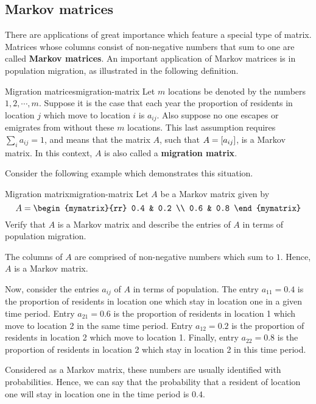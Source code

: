 \subsection{Markov matrices}

There are applications of great importance which feature a special type of matrix.  Matrices whose columns consist of non-negative numbers that sum to one are
called \textbf{Markov matrices}. An important application of Markov matrices is
in population migration, as illustrated in the following definition. 

\begin{definition}{Migration matrices}{migration-matrix}
Let $m$ locations be denoted by the numbers $1,2,\cdots ,m$. Suppose
it is the case that each year the proportion of residents in location
$j$ which move to location $i$ is $a_{ij}$. Also suppose no one
escapes or emigrates from without these $m$ locations. This last
assumption requires $\sum_{i}a_{ij}=1$, and means that the matrix $A$,
such that $A = \left[a_{ij} \right]$, is a Markov matrix. In this context,
$A$ is also called a \textbf{migration matrix}.
\end{definition}

Consider the following example which demonstrates this situation.

\begin{example}{Migration matrix}{migration-matrix}
Let $A$ be a Markov matrix given by 
\begin{equation*}
A = 
\begin{mymatrix}{rr}
0.4 & 0.2 \\
0.6 & 0.8
\end{mymatrix}
\end{equation*}
Verify that $A$ is a Markov matrix and describe the entries of $A$ in terms of population migration.
\end{example}

\begin{solution}
The columns of $A$ are comprised of non-negative numbers which sum to $1$. Hence, $A$ is a Markov matrix. 

Now, consider the entries $a_{ij}$ of $A$ in terms of population. The
entry $a_{11} = 0.4$ is the proportion of residents in location one
which stay in location one in a given time period.  Entry $a_{21} =
0.6$ is the proportion of residents in location 1 which move to
location 2 in the same time period. Entry $a_{12} = 0.2$ is the
proportion of residents in location 2 which move to location
1. Finally, entry $a_{22} = 0.8$ is the proportion of residents in
location 2 which stay in location 2 in this time period.  

Considered as a Markov matrix, these numbers are usually identified
with probabilities. Hence, we can say that the probability that a
resident of location one will stay in location one in the time period
is $0.4$.
\end{solution}

